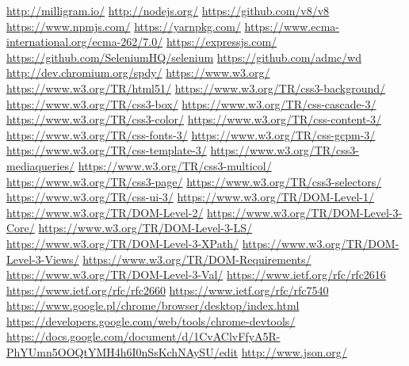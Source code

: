 \documentclass[polish, twoside, 12pt]{mwart}
\begin{document}
\begin{thebibliography}{11}
    \url{http://milligram.io/}
    \url{http://nodejs.org/}
    \url{https://github.com/v8/v8}
    \url{https://www.npmjs.com/}
    \url{https://yarnpkg.com/}
    \url{https://www.ecma-international.org/ecma-262/7.0/}
    \url{https://expressjs.com/}
    \url{https://github.com/SeleniumHQ/selenium}
    \url{https://github.com/admc/wd}
    \url{http://dev.chromium.org/spdy/}
    \url{https://www.w3.org/}
    \url{https://www.w3.org/TR/html51/}
    \url{https://www.w3.org/TR/css3-background/}
    \url{https://www.w3.org/TR/css3-box/}
    \url{https://www.w3.org/TR/css-cascade-3/}
    \url{https://www.w3.org/TR/css3-color/}
    \url{https://www.w3.org/TR/css-content-3/}
    \url{https://www.w3.org/TR/css-fonts-3/}
    \url{https://www.w3.org/TR/css-gcpm-3/}
    \url{https://www.w3.org/TR/css-template-3/}
    \url{https://www.w3.org/TR/css3-mediaqueries/}
    \url{https://www.w3.org/TR/css3-multicol/}
    \url{https://www.w3.org/TR/css3-page/}
    \url{https://www.w3.org/TR/css3-selectors/}
    \url{https://www.w3.org/TR/css-ui-3/}
    \url{https://www.w3.org/TR/DOM-Level-1/}
    \url{https://www.w3.org/TR/DOM-Level-2/}
    \url{https://www.w3.org/TR/DOM-Level-3-Core/}
    \url{https://www.w3.org/TR/DOM-Level-3-LS/}
    \url{https://www.w3.org/TR/DOM-Level-3-XPath/}
    \url{https://www.w3.org/TR/DOM-Level-3-Views/}
    \url{https://www.w3.org/TR/DOM-Requirements/}
    \url{https://www.w3.org/TR/DOM-Level-3-Val/}
    \url{https://www.ietf.org/rfc/rfc2616}
    \url{https://www.ietf.org/rfc/rfc2660}
    \url{https://www.ietf.org/rfc/rfc7540}
    \url{https://www.google.pl/chrome/browser/desktop/index.html}
    \url{https://developers.google.com/web/tools/chrome-devtools/}
    \url{https://docs.google.com/document/d/1CvAClvFfyA5R-PhYUmn5OOQtYMH4h6I0nSsKchNAySU/edit}
    \url{http://www.json.org/}
\end{thebibliography}
\end{document}
